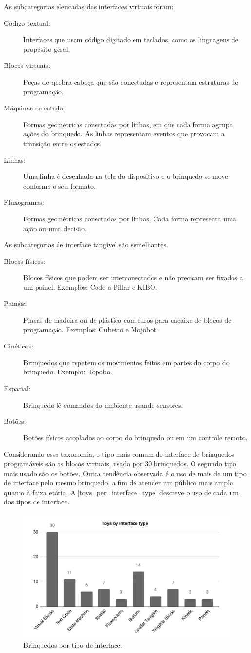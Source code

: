 As subcategorias elencadas das interfaces virtuais foram: 
\begin{description}
    \item[Código textual: ] Interfaces que usam código digitado em teclados, como as linguagens de propósito geral. 
    \item[Blocos virtuais: ] Peças de quebra-cabeça que são conectadas e representam estruturas de programação.
    \item[Máquinas de estado: ] Formas geométricas conectadas por linhas, em que cada forma agrupa ações do brinquedo. As linhas representam eventos que provocam a transição entre os estados.
    \item[Linhas: ] Uma linha é desenhada na tela do dispositivo e o brinquedo se move conforme o seu formato.
    \item[Fluxogramas: ] Formas geométricas conectadas por linhas. Cada forma representa uma ação ou uma decisão.
\end{description}

As subcategorias de interface tangível são semelhantes.

\begin{description}
    \item[Blocos físicos: ] Blocos físicos que podem ser interconectados e não precisam ser fixados a um painel. Exemplos: Code a Pillar e KIBO. 
    \item[Painéis: ] Placas de madeira ou de plástico com furos para encaixe de blocos de programação. Exemplos: Cubetto e Mojobot.
    \item[Cinéticos: ] Brinquedos que repetem os movimentos feitos em partes do corpo do brinquedo. Exemplo: Topobo.
    \item[Espacial: ] Brinquedo lê comandos do ambiente usando sensores.
    \item[Botões: ] Botões físicos acoplados ao corpo do brinquedo ou em um controle remoto.
\end{description}

Considerando essa taxonomia, o tipo mais comum de interface de brinquedos programáveis são os blocos virtuais, usada por 30 brinquedos. O segundo tipo mais usado são os botões. Outra tendência observada é o uso de mais de um tipo de interface pelo mesmo brinquedo, a fim de atender um público mais amplo quanto à faixa etária. A \autoref{toys_per_interface_type} descreve o uso de cada um dos tipos de interface.

\begin{figure}[!htbp]
    \centering
    \includegraphics[width=.6\linewidth,fbox]{figs/toys_per_interface_type.png}
    \caption{Brinquedos por tipo de interface.}
    \label{toys_per_interface_type}
    \sourceauthor
\end{figure}

